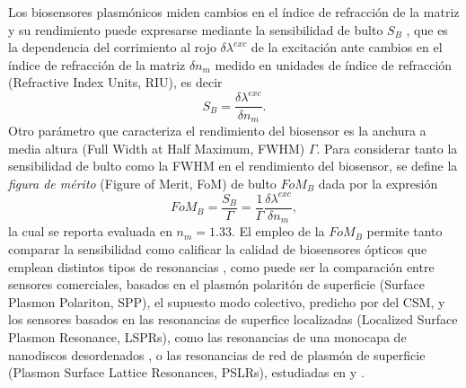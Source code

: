 Los biosensores plasmónicos miden cambios en el índice de refracción de la matriz y su rendimiento puede expresarse mediante la sensibilidad de bulto $S_B$ \cite{estevez2014trends,svedendahl2009refractometric}, que es la dependencia del corrimiento al rojo $\delta \lambda^{exc}$ de la excitación ante cambios en el índice de refracción de la matriz $\delta n_m$ medido en unidades de índice de refracción (Refractive Index Units, RIU), es decir
%
	\begin{equation}
	S_B = \frac{\delta \lambda^{exc}}{\delta n_m}.
	\label{eq:SBulk}
	\end{equation}
%
Otro parámetro que caracteriza el rendimiento del biosensor es la anchura a media altura (Full Width at Half Maximum, FWHM) $\Gamma$. Para considerar tanto la sensibilidad de bulto como la FWHM en el rendimiento del biosensor, se define la \emph{figura de mérito} (Figure of Merit, FoM) de bulto  $\textit{FoM}_B$ dada por la expresión
%
	\begin{equation}
	\textit{FoM}_B = \frac{S_B}{\Gamma}
			=\frac{1}{\Gamma}\frac{\delta \lambda^{exc}}{\delta n_m},
	\label{eq:FoM}
	\end{equation}
%
la cual se reporta evaluada en $n_m=1.33$. El empleo de la $\textit{FoM}_B$ permite tanto comparar  la sensibilidad como calificar la calidad de biosensores ópticos que emplean distintos tipos de resonancias \cite{svedendahl2009refractometric}, como puede ser la comparación entre sensores comerciales, basados en el plasmón polaritón de superficie (Surface Plasmon Polariton, SPP), el supuesto modo colectivo, predicho por del CSM, y los sensores basados en las resonancias de superfice localizadas (Localized Surface Plasmon Resonance, LSPRs), como las resonancias de una monocapa de nanodiscos desordenados \cite{svedendahl2009refractometric}, o las resonancias de red de plasmón de superficie (Plasmon Surface Lattice Resonances, PSLRs), estudiadas en \cite{kabashin2009plasmonic} y \cite{danilov2018ultra}.


